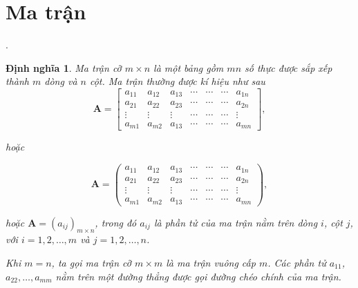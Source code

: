 \documentclass[12pt,a4paper,oneside]{report}
\newtheorem{dn}{Định nghĩa}[section]
\numberwithin{equation}{section}
\begin{document}
\section{Ma trận}.
\begin{dn} \cite{hieu2019}                    %
 Ma trận cỡ $m \times n$ là một bảng gồm $m n$ số thực được sắp xếp thành $m$ dòng và $n$ cột. Ma trận thường được kí hiệu như sau\\
 $$
 \mathbf{A}=\left[\begin{array}{ccccccc}
 	a_{11} & a_{12} & a_{13} & \cdots & \cdots & \cdots & a_{1 n} \\
 	a_{21} & a_{22} & a_{23} & \cdots & \cdots & \cdots & a_{2 n} \\
 	\vdots & \vdots & \vdots & \cdots & \cdots & \cdots & \vdots \\
 	a_{m 1} & a_{m 2} & a_{13} & \cdots & \cdots & \cdots & a_{m n}
 \end{array}\right],
 $$
 
 hoặc
 
 $$
 \mathbf{A}=\left(\begin{array}{ccccccc}
 	a_{11} & a_{12} & a_{13} & \cdots & \cdots & \cdots & a_{1 n} \\
 	a_{21} & a_{22} & a_{23} & \cdots & \cdots & \cdots & a_{2 n} \\
 	\vdots & \vdots & \vdots & \cdots & \cdots & \cdots & \vdots \\
 	a_{m 1} & a_{m 2} & a_{13} & \cdots & \cdots & \cdots & a_{m n}
 \end{array}\right),
 $$
 
 hoặc $\mathbf{A}=\left(a_{i j}\right)_{m \times n}$, trong đó $a_{i j}$ là phần tử của ma trận nằm trên dòng $i$, cột $j$, với $i=1,2, \ldots, m$ và $j=1,2, \ldots, n$.
 
 Khi $m=n$, ta gọi ma trận cỡ $m \times m$ là ma trận vuông cấp $m$. Các phần tử $a_{11}$, $a_{22}, \ldots, a_{m m}$ nằm trên một đường thẳng được gọi đường chéo chính của ma trận.
\end{dn}
	
\end{document}
